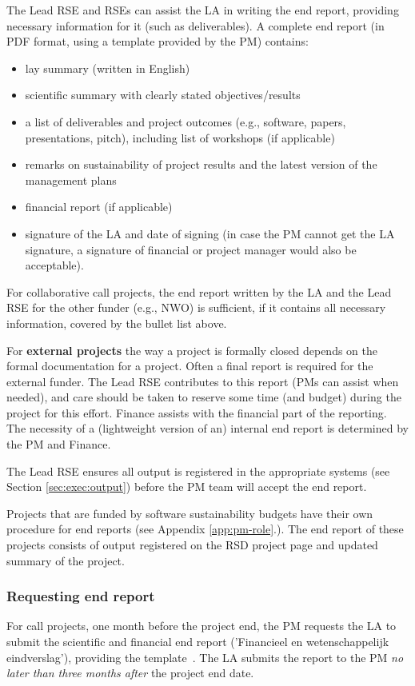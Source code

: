 The Lead RSE and RSEs can assist the LA in writing the end report, providing necessary information for it (such as
deliverables). A complete end report (in PDF format, using a template provided by the PM) contains:
\begin{itemize}
\item lay summary (written in English)
\item scientific summary with clearly stated objectives/results
\item a list of deliverables and project outcomes (e.g., software, papers, presentations, pitch), including list of workshops
(if applicable) 
\item remarks on sustainability of project results and the latest version of the management plans
\item financial report (if applicable)
\item signature of the LA and date of signing (in case the PM cannot get the LA signature, a signature of financial or project
manager would also be acceptable).
\end{itemize}

For collaborative call projects, the end report written by the LA and the Lead RSE for the other funder (e.g., NWO) is
sufficient, if it contains all necessary information, covered by the bullet list above.

For \textbf{external projects} the way a project is formally closed depends on the formal documentation for a project.
Often a final report is required for the external funder. The Lead RSE contributes to this report (PMs can assist when
needed), and care should be taken to reserve some time (and budget) during the project for this effort. Finance assists
with the financial part of the reporting. The necessity of a (lightweight version of an) internal end report is
determined by the PM and Finance.

The Lead RSE ensures all output is registered in the appropriate systems (see Section \ref{sec:exec:output}) before the
PM team will accept the end report.

Projects that are funded by software sustainability budgets have their own procedure for end reports (see Appendix
\ref{app:pm-role}.). The end report of these projects consists of output registered on the RSD project page and
updated summary of the project.



\subsubsection{Requesting end report}
For call projects, one month before the project end, the PM requests the LA to submit the scientific and financial end
report ('Financieel en wetenschappelijk eindverslag'), providing the
template~\cite{proj-templates}. The LA submits the report to the PM \textit{no later than three months after} the project end date.


